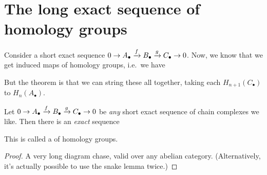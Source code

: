 \section{The long exact sequence of homology groups}
Consider a short exact sequence $0 \to A_\bullet \xrightarrow{f} B_\bullet \xrightarrow{g} C_\bullet \to 0$.
Now, we know that we get induced maps of homology groups, i.e.\ we have
\begin{center}
\end{center}
But the theorem is that we can string these all together,
taking each $H_{n+1}(C_\bullet)$ to $H_n(A_\bullet)$.

\begin{theorem}
	\label{thm:long_exact}
	Let $0 \to A_\bullet \xrightarrow{f} B_\bullet \xrightarrow{g} C_\bullet \to 0$
	be \emph{any} short exact sequence of chain complexes we like.
	Then there is an \emph{exact} sequence
	\begin{center}
	\end{center}
	This is called a  of homology groups.
\end{theorem}
\begin{proof}
	A very long diagram chase, valid over any abelian category.
	(Alternatively, it's actually possible to use the snake lemma twice.)
\end{proof}

